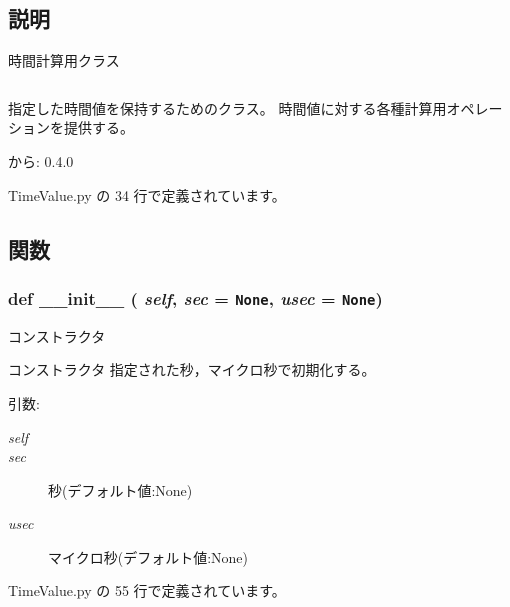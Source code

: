 \subsection{説明}
時間計算用クラス 



\footnotesize\begin{verbatim}
\end{verbatim}
\normalsize


指定した時間値を保持するためのクラス。 時間値に対する各種計算用オペレーションを提供する。

\begin{Desc}
\item[から:]0.4.0 \end{Desc}


 TimeValue.py の 34 行で定義されています。

\subsection{関数}
\subsubsection{\setlength{\rightskip}{0pt plus 5cm}def \_\-\_\-init\_\-\_\- ( {\em self},  {\em sec} = {\tt None},  {\em usec} = {\tt None})}\label{classsource__py_1_1_time_value_1_1_time_value_c775ee34451fdfa742b318538164070e}


コンストラクタ 

コンストラクタ 指定された秒，マイクロ秒で初期化する。

\begin{Desc}
\item[引数:]
\begin{description}
\item[{\em self}]\item[{\em sec}]秒(デフォルト値:None) \item[{\em usec}]マイクロ秒(デフォルト値:None) \end{description}
\end{Desc}


 TimeValue.py の 55 行で定義されています。
